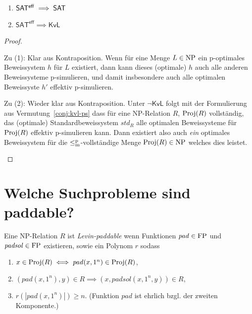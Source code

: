 \begin{theorem}\label{thm:sateff-generalizes-sat}
    \begin{enumerate}
        \item $\mathsf{SAT^{eff}}\implies \mathsf{SAT}$
        \item $\mathsf{SAT^{eff}}\implies \mathsf{KvL}$
    \end{enumerate}
\end{theorem}
\begin{proof}
\begin{prooflist}
\item Zu (1): Klar aus Kontraposition. Wenn für eine Menge $L\in\mathrm{NP}$ ein p-optimales Beweissystem $h$ für $L$ existiert, dann kann dieses (optimale) $h$ auch alle anderen Beweissysteme p-simulieren, und damit insbesondere auch alle optimalen Beweissyste $h'$ effektiv p-simulieren.

\item Zu (2): Wieder klar aus Kontraposition. Unter $\neg\mathsf{KvL}$ folgt mit der Formulierung aus Vermutung~\ref{conj:kvl-ps} dass für eine NP-Relation $R$, $\operatorname{Proj}(R)$ vollständig, das (optimale) Standardbeweissystem $\mathit{std}_R$ alle optimalen Beweissysteme für $\operatorname{Proj}(R)$ effektiv p-simulieren kann. Dann existiert also auch \emph{ein} optimales Beweissystem für die $\leq_\mathrm{m}^\mathrm{p}$-vollständige Menge $\operatorname{Proj}(R)\in\mathrm{NP}$ welches dies leistet.
\end{prooflist}
\end{proof}


\section{Welche Suchprobleme sind paddable?}

\begin{definition}\label{def:levin-paddable}
    Eine NP-Relation $R$ ist \emph{Levin-paddable} wenn 
    Funktionen $\mathit{pad}\in\mathrm{FP}$ und $\mathit{padsol}\in\mathrm{FP}$ existieren, sowie ein Polynom $r$ sodass
    \begin{enumerate}
        \item $x\in \operatorname{Proj}(R) \iff \mathit{pad}(x, 1^n) \in \operatorname{Proj}(R)$,
        \item $(\mathit{pad}(x, 1^n), y)\in R \implies (x, \mathit{padsol}(x, 1^n, y)) \in R$,
        \item $r(|\mathit{pad}(x, 1^n)|)\geq n$. (Funktion $\mathit{pad}$ ist ehrlich bzgl. der zweiten Komponente.)\qedhere
    \end{enumerate}
\end{definition}

